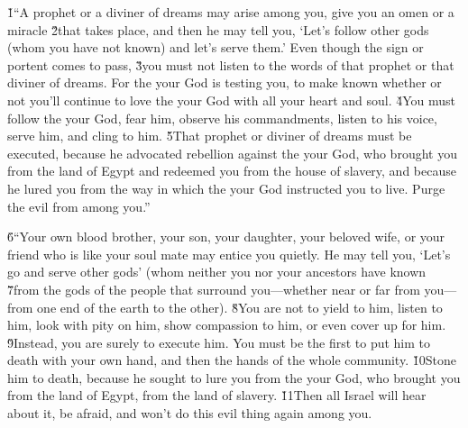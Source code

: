 \v{1}``A prophet or a diviner of dreams may arise among you, give you an omen or a miracle \v{2}that takes place, and then he may tell you, `Let's follow other gods (whom you have not known) and let's serve them.' Even though the sign or portent comes to pass, \v{3}you must not listen to the words of that prophet or that diviner of dreams. For the  your God is testing you, to make known whether or not you'll continue to love the  your God with all your heart and soul. \v{4}You must follow the  your God, fear him, observe his commandments, listen to his voice, serve him, and cling to him. \v{5}That prophet or diviner of dreams must be executed, because he advocated rebellion against the  your God, who brought you from the land of Egypt and redeemed you from the house of slavery, and because he lured you from the way in which the  your God instructed you to live. Purge the evil from among you.''

\v{6}``Your own blood brother, your son, your daughter, your beloved wife, or your friend who is like your soul mate may entice you quietly. He may tell you, `Let's go and serve other gods' (whom neither you nor your ancestors have known \v{7}from the gods of the people that surround you---whether near or far from you---from one end of the earth to the other). \v{8}You are not to yield to him, listen to him, look with pity on him, show compassion to him, or even cover up for him. \v{9}Instead, you are surely to execute him. You must be the first to put him to death with your own hand, and then the hands of the whole community. \v{10}Stone him to death, because he sought to lure you from the  your God, who brought you from the land of Egypt, from the land of slavery. \v{11}Then all Israel will hear about it, be afraid, and won't do this evil thing again among you.

